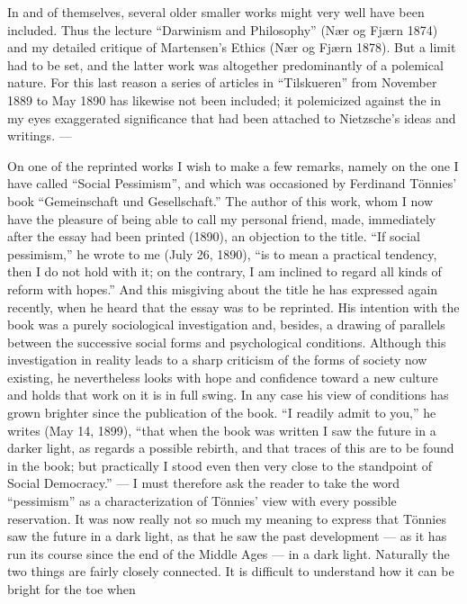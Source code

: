 \documentclass[12pt,a4paper,openany]{book}
\newcommand{\opage}[1]{\marginnote{\footnotesize\textit{[#1]}}}
\begin{document}
In and of themselves, several older smaller works might very well
have been included. Thus the lecture ``Darwinism and
Philosophy'' (Nær og Fjærn 1874) and my detailed critique of
Martensen's Ethics (Nær og Fjærn 1878). But
a limit had to be set, and the latter work was altogether
predominantly of a polemical nature. For this last reason
a series of articles in ``Tilskueren'' from November
1889 to May 1890 has likewise not been included; it polemicized against the
in my eyes exaggerated significance that had been attached to
Nietzsche's ideas and writings. ---

On one of the reprinted works I wish to
make a few remarks, namely on the one I have called
``Social Pessimism'', %
and which was occasioned by Ferdinand
Tönnies' book ``Gemeinschaft und Gesellschaft.'' The author
of this work, whom I now have the pleasure of being able to call
my personal friend, made, immediately after the essay had
been printed (1890), an objection to the title. ``If social
\opage{VII}pessimism,'' he wrote to me (July 26, 1890), ``is to mean
a practical tendency, then I do not hold with it; on the contrary, I
am inclined to regard all kinds of reform with
hopes.'' And this misgiving about the title he has
expressed again recently, when he heard that the essay was to be
reprinted. His intention with the book was a purely sociological
investigation and, besides, a drawing of parallels between the successive
social forms and psychological conditions. Although
this investigation in reality leads to a sharp criticism
of the forms of society now existing, he nevertheless looks with
hope and confidence toward a new culture and holds that work
on it is in full swing. In any case his view of
conditions has grown brighter since the publication of the book. ``I
readily admit to you,'' he writes (May 14, 1899), ``that when the
book was written I saw the future in a darker light, as regards
a possible rebirth, and that traces of this are to be found in
the book; but practically I stood even then very close to
the standpoint of Social Democracy.'' --- I must therefore ask the
reader to take the word ``pessimism'' as a characterization of
Tönnies' view with every possible reservation. It was now
really not so much my meaning to express that
Tönnies saw the future in a dark light, as that he saw
the past development --- as it has run its course since
the end of the Middle Ages --- in a dark light. Naturally
the two things are fairly closely connected. It is
difficult to understand how it can be bright for the toe when
\end{document}
